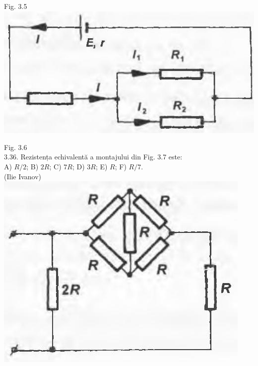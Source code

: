 \documentclass[10pt]{article}
\begin{document}
Fig. 3.5\\
\includegraphics[max width=\textwidth, center]{2025_07_01_5b3ff9fa0d508c8e9f17g-151}

Fig. 3.6\\
3.36. Rezistența echivalentă a montajului din Fig. 3.7 este:\\
A) $R / 2$; B) $2 R$; C) $7 R$; D) $3 R$; E) $R$; F) $R / 7$.\\
(Ilie Ivanov)\\
\includegraphics[max width=\textwidth, center]{2025_07_01_5b3ff9fa0d508c8e9f17g-151(2)}
\end{document}
